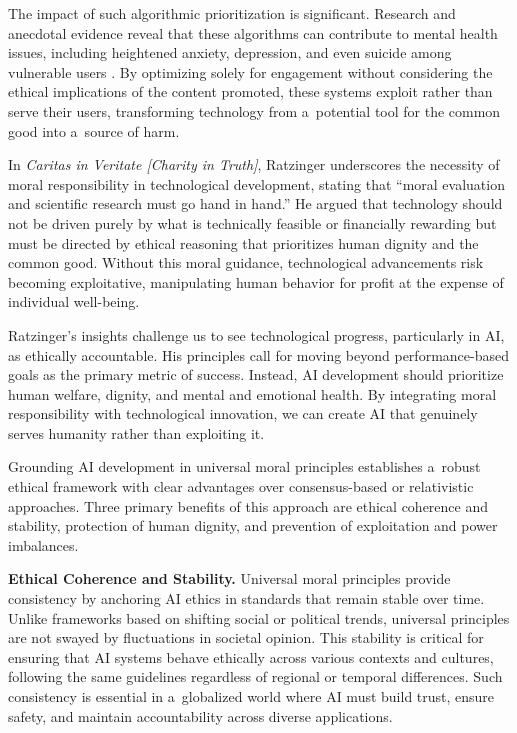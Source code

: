 \documentclass[%
  manuscript=article,
  year=2024,
  volume=77,
  doi=00000.000,
]{zfn}
\begin{document}
The impact of such algorithmic prioritization is significant. Research and anecdotal evidence reveal that these algorithms can contribute to mental health issues, including heightened anxiety, depression, and even suicide among vulnerable users 
\parencite[][]{panoptykon_foundation_fixing_2023}. %
 By optimizing solely for engagement without considering the ethical implications of the content promoted, these systems exploit rather than serve their users, transforming technology from a~potential tool for the common good into a~source of harm.



In \textit{Caritas in Veritate [Charity in Truth]}, Ratzinger underscores the necessity of moral responsibility in technological development, stating that ``moral evaluation and scientific research must go hand in hand.'' 
\parencite[][section 31]{benedict_xvi_caritas_2009} %
 He argued that technology should not be driven purely by what is technically feasible or financially rewarding but must be directed by ethical reasoning that prioritizes human dignity and the common good. Without this moral guidance, technological advancements risk becoming exploitative, manipulating human behavior for profit at the expense of individual well-being.



Ratzinger's insights challenge us to see technological progress, particularly in AI, as ethically accountable. His principles call for moving beyond performance-based goals as the primary metric of success. Instead, AI development should prioritize human welfare, dignity, and mental and emotional health. By integrating moral responsibility with technological innovation, we can create AI that genuinely serves humanity rather than exploiting it.



Grounding AI development in universal moral principles establishes a~robust ethical framework with clear advantages over consensus-based or relativistic approaches. Three primary benefits of this approach are ethical coherence and stability, protection of human dignity, and prevention of exploitation and power imbalances.



\textbf{Ethical Coherence and Stability.} Universal moral principles provide consistency by anchoring AI ethics in standards that remain stable over time. Unlike frameworks based on shifting social or political trends, universal principles are not swayed by fluctuations in societal opinion. This stability is critical for ensuring that AI systems behave ethically across various contexts and cultures, following the same guidelines regardless of regional or temporal differences. Such consistency is essential in a~globalized world where AI must build trust, ensure safety, and maintain accountability across diverse applications.
\end{document}
